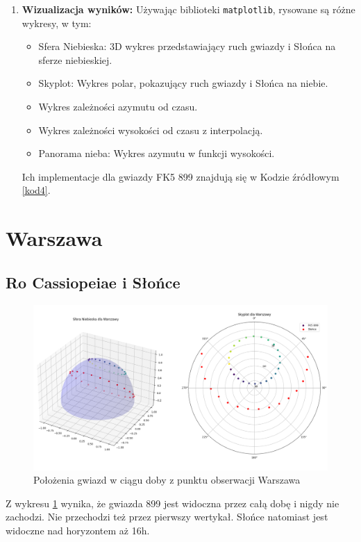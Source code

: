 \documentclass[fleqn,10pt,a4paper]{article}
\begin{document}
\begin{enumerate}
  \item \textbf{Wizualizacja wyników:}
  Używając biblioteki \texttt{matplotlib}, rysowane są różne wykresy, w tym:
  \begin{itemize}
      \item Sfera Niebieska: 3D wykres przedstawiający ruch gwiazdy i Słońca na sferze niebieskiej.
      \item Skyplot: Wykres polar, pokazujący ruch gwiazdy i Słońca na niebie.
      \item Wykres zależności azymutu od czasu.
      \item Wykres zależności wysokości od czasu z interpolacją.
      \item Panorama nieba: Wykres azymutu w funkcji wysokości.
  \end{itemize}
  Ich implementacje dla gwiazdy FK5 899 znajdują się w Kodzie źródłowym \ref{kod4}.

\end{enumerate}

\section{Warszawa}
\subsection{Ro Cassiopeiae i Słońce}
\begin{figure}[h!]
    \centering
    \includegraphics[width=1\textwidth]{zdjecia/fig1_wwa.png}
    \caption{Położenia gwiazd w ciągu doby z punktu obserwacji Warszawa}
    \label{all_wwa}
\end{figure}

Z wykresu \ref{all_wwa} wynika, że gwiazda 899 jest widoczna przez całą dobę i nigdy nie zachodzi. Nie przechodzi też
przez pierwszy wertykał. Słońce natomiast jest widoczne nad horyzontem aż 16h.
\end{document}
